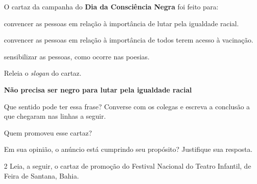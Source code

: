 \begin{escolha}
\item O cartaz da campanha do \textbf{Dia da Consciência Negra} foi feito para:

\begin{boxlist}
\boxitem[\rosa{X}] convencer as pessoas em relação à importância de lutar pela igualdade racial.

\boxitem[] convencer as pessoas em relação à importância de todos terem acesso à vacinação.

\boxitem[] sensibilizar as pessoas, como ocorre nas poesias.
\end{boxlist}

\item Releia o \emph{slogan} do cartaz.

\begin{mdframed}[linewidth=10pt,linecolor=salmao!20,backgroundcolor=salmao!20,roundcorner=20pt]
\textbf{Não precisa ser negro para lutar pela igualdade racial}
\end{mdframed}

Que sentido pode ter essa frase? Converse com os colegas e escreva a
conclusão a que chegaram nas linhas a seguir.


\item Quem promoveu esse cartaz?


\item Em sua opinião, o anúncio está cumprindo seu propósito? Justifique 
sua resposta.

\end{escolha}

\num{2} Leia, a seguir, o cartaz de promoção do Festival Nacional do Teatro
Infantil, de Feira de Santana, Bahia.


